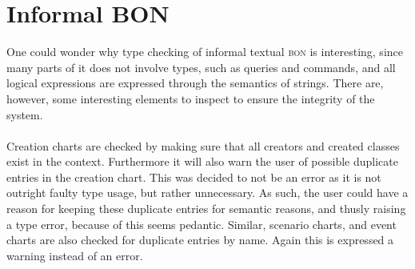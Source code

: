 \section{Informal BON}
One could wonder why type checking of informal textual \textsc{bon} is interesting, since many parts of it does not involve types, such as queries and commands, and all logical expressions are expressed through the semantics of strings. There are, however, some interesting elements to inspect to ensure the integrity of the system.

\paragraph{}
Creation charts are checked by making sure that all creators and created classes exist in the context. Furthermore it will also warn the user of possible duplicate entries in the creation chart. This was decided to not be an error as it is not outright faulty type usage, but rather unnecessary. As such, the user could have a reason for keeping these duplicate entries for semantic reasons, and thusly raising a type error, because of this seems pedantic. Similar, scenario charts, and event charts are also checked for duplicate entries by name. Again this is expressed a warning instead of an error.

